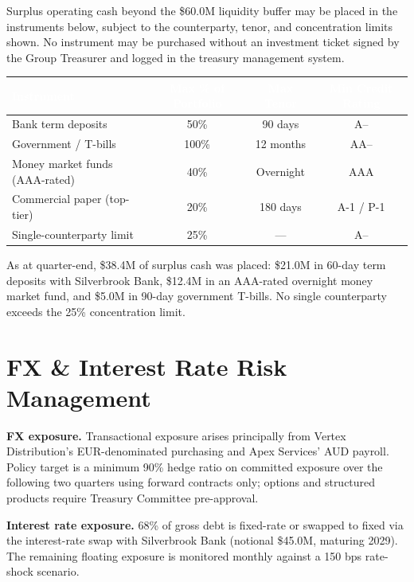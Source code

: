 \documentclass[11pt,a4paper]{scrreprt}
\begin{document}
Surplus operating cash beyond the \$60.0M liquidity buffer may be placed in the
instruments below, subject to the counterparty, tenor, and concentration limits shown.
No instrument may be purchased without an investment ticket signed by the Group
Treasurer and logged in the treasury management system.

\begin{table}[h!]
\centering
\small
\begin{tabularx}{\textwidth}{@{}Xccc@{}}
\toprule
\rowcolor{treasurynavy}
\textcolor{white}{\bfseries Instrument} & \textcolor{white}{\bfseries Max \% of Portfolio} &
\textcolor{white}{\bfseries Max Tenor} & \textcolor{white}{\bfseries Min Credit Rating} \\
\midrule
Bank term deposits            & 50\% & 90 days  & A-- \\
\rowcolor{treasurygray}
Government / T-bills          & 100\% & 12 months & AA-- \\
Money market funds (AAA-rated)& 40\% & Overnight & AAA \\
\rowcolor{treasurygray}
Commercial paper (top-tier)   & 20\% & 180 days & A-1 / P-1 \\
Single-counterparty limit     & 25\% & --- & A-- \\
\bottomrule
\end{tabularx}
\end{table}

\noindent As at quarter-end, \$38.4M of surplus cash was placed: \$21.0M in 60-day term
deposits with Silverbrook Bank, \$12.4M in an AAA-rated overnight money market fund, and
\$5.0M in 90-day government T-bills. No single counterparty exceeds the 25\% concentration
limit.

\section{FX \& Interest Rate Risk Management}

\begin{minipage}[t]{0.48\textwidth}
\textbf{\color{treasurynavy}FX exposure.} Transactional exposure arises principally from
Vertex Distribution's EUR-denominated purchasing and Apex Services' AUD payroll. Policy
target is a minimum 90\% hedge ratio on committed exposure over the following two
quarters using forward contracts only; options and structured products require Treasury
Committee pre-approval.
\end{minipage}\hfill
\begin{minipage}[t]{0.48\textwidth}
\textbf{\color{treasurynavy}Interest rate exposure.} 68\% of gross debt is fixed-rate or
swapped to fixed via the interest-rate swap with Silverbrook Bank (notional \$45.0M,
maturing 2029). The remaining floating exposure is monitored monthly against a 150 bps
rate-shock scenario.
\end{minipage}
\par
\vspace{0.5cm}
\end{document}
